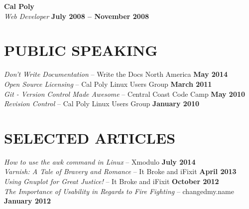 \documentclass[margin,line]{resume}
\begin{document}
\begin{resume}
    \textbf{\listing Cal Poly} \vspace{2mm}\\\vspace{1mm}%
    \textsl{Web Developer} \hfill \textbf{July 2008 -- November 2008}

\sectionline

    \section{\mysidestyle \textbf{\large{P}\small{UBLIC} \large{S}\small{PEAKING}}}

    \textsl{Don't Write Documentation} -- Write the Docs North America \hfill \textbf{May 2014}\\
    \textsl{Open Source Licensing} -- Cal Poly Linux Users Group \hfill \textbf{March 2011}\\
    \textsl{Git - Version Control Made Awesome} -- Central Coast Code Camp \hfill \textbf{May 2010}\\
    \textsl{Revision Control} -- Cal Poly Linux Users Group \hfill \textbf{January 2010}\\

    \vspace{-4mm}

\sectionline

    \section{\mysidestyle \textbf{\large{S}\small{ELECTED} \large{A}\small{RTICLES}}}

    \textsl{How to use the awk command in Linux} -- Xmodulo \hfill \textbf{July 2014}\\
    \textsl{Varnish: A Tale of Bravery and Romance} -- It Broke and iFixit \hfill \textbf{April 2013}\\
    \textsl{Using Gnuplot for Great Justice!} -- It Broke and iFixit \hfill \textbf{October 2012}\\
    \textsl{The Importance of Usability in Regards to Fire Fighting} -- changedmy.name \hfill \textbf{January 2012}\\

    \vspace{-4mm}


\end{resume}
\end{document}
